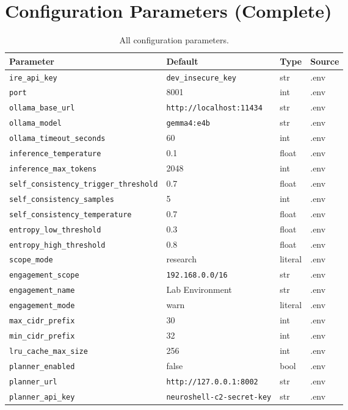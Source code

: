 ﻿\documentclass[10pt,journal,onecolumn]{IEEEtran}
\begin{document}
\section{Configuration Parameters (Complete)}
\begin{table}[t]
\caption{All configuration parameters.}
\label{tab:appH}
\begin{tabularx}{\textwidth}{>{\ttfamily}l X l l}
\toprule
\textbf{Parameter} & \textbf{Default} & \textbf{Type} & \textbf{Source}\\
\midrule
\texttt{ire\_api\_key} & \texttt{dev\_insecure\_key} & str & .env\\
\texttt{port} & 8001 & int & .env\\
\texttt{ollama\_base\_url} & \texttt{http://localhost:11434} & str & .env\\
\texttt{ollama\_model} & \texttt{gemma4:e4b} & str & .env\\
\texttt{ollama\_timeout\_seconds} & 60 & int & .env\\
\texttt{inference\_temperature} & 0.1 & float & .env\\
\texttt{inference\_max\_tokens} & 2048 & int & .env\\
\texttt{self\_consistency\_trigger\_threshold} & 0.7 & float & .env\\
\texttt{self\_consistency\_samples} & 5 & int & .env\\
\texttt{self\_consistency\_temperature} & 0.7 & float & .env\\
\texttt{entropy\_low\_threshold} & 0.3 & float & .env\\
\texttt{entropy\_high\_threshold} & 0.8 & float & .env\\
\texttt{scope\_mode} & research & literal & .env\\
\texttt{engagement\_scope} & \texttt{192.168.0.0/16} & str & .env\\
\texttt{engagement\_name} & Lab Environment & str & .env\\
\texttt{engagement\_mode} & warn & literal & .env\\
\texttt{max\_cidr\_prefix} & 30 & int & .env\\
\texttt{min\_cidr\_prefix} & 32 & int & .env\\
\texttt{lru\_cache\_max\_size} & 256 & int & .env\\
\texttt{planner\_enabled} & false & bool & .env\\
\texttt{planner\_url} & \texttt{http://127.0.0.1:8002} & str & .env\\
\texttt{planner\_api\_key} & \texttt{neuroshell-c2-secret-key} & str & .env\\

\end{tabularx}
\end{table}
\end{document}
